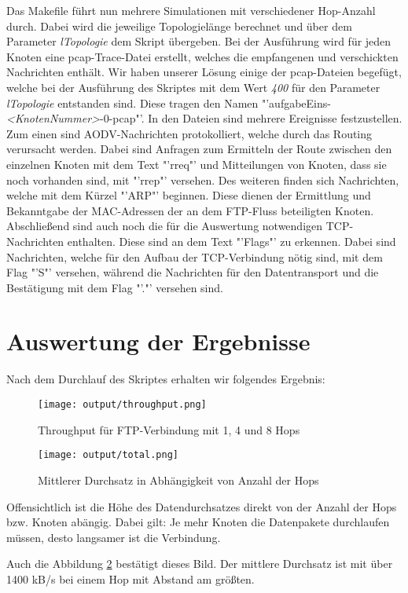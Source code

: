 \documentclass[12pt,a4paper,titlepage]{article}
\begin{document}
Das Makefile führt nun mehrere Simulationen mit verschiedener Hop-Anzahl durch. Dabei wird die jeweilige Topologielänge berechnet und über dem Parameter \textit{lTopologie} dem Skript übergeben. Bei der Ausführung wird für jeden Knoten eine pcap-Trace-Datei erstellt, welches die empfangenen und verschickten Nachrichten enthält. Wir haben unserer Lösung einige der pcap-Dateien begefügt, welche bei der Ausführung des Skriptes mit dem Wert \textit{400} für den Parameter \textit{lTopologie} entstanden sind. Diese tragen den Namen "'aufgabeEins-\textit{\textless KnotenNummer\textgreater}-0-pcap"'. 
In den Dateien sind mehrere Ereignisse festzustellen. Zum einen sind AODV-Nachrichten protokolliert, welche durch das Routing verursacht werden. Dabei sind Anfragen zum Ermitteln der Route zwischen den einzelnen Knoten mit dem Text "'rreq"'  und Mitteilungen von Knoten, dass sie noch vorhanden sind, mit "'rrep"' versehen. 
Des weiteren finden sich Nachrichten, welche mit dem Kürzel "'ARP"' beginnen. Diese dienen der Ermittlung und Bekanntgabe der MAC-Adressen der an dem FTP-Fluss beteiligten Knoten. Abschließend sind auch noch die für die Auswertung notwendigen TCP-Nachrichten enthalten. Diese sind an dem Text "'Flags"' zu erkennen. Dabei sind Nachrichten, welche für den Aufbau der TCP-Verbindung nötig sind, mit dem Flag "'S"' versehen, während die Nachrichten für den Datentransport und die Bestätigung mit dem Flag "'."' versehen sind.


\section{Auswertung der Ergebnisse}

Nach dem Durchlauf des Skriptes erhalten wir folgendes Ergebnis:

\begin{figure}[h]
	\centering
% 	
	\texttt{[image: output/throughput.png]}
	\caption{Throughput für FTP-Verbindung mit 1, 4 und 8 Hops}
	\label{Durchsatz}
\end{figure}

\begin{figure}[h]
	\centering
% 	
	\texttt{[image: output/total.png]}
	\caption{Mittlerer Durchsatz in Abhängigkeit von Anzahl der Hops}
	\label{Durchsatz2}
\end{figure}

Offensichtlich ist die Höhe des Datendurchsatzes direkt von der Anzahl der Hops bzw. Knoten abängig. Dabei gilt: Je mehr Knoten die Datenpakete durchlaufen müssen, desto langsamer ist die Verbindung.

Auch die Abbildung \ref{Durchsatz2} bestätigt dieses Bild. Der mittlere Durchsatz ist mit über 1400 kB/s bei einem Hop mit Abstand am größten.
\end{document}
